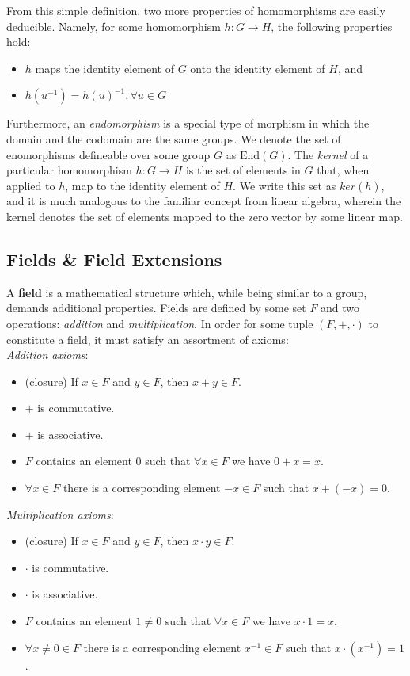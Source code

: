 From this simple definition, two more properties of homomorphisms are easily deducible. Namely, for some homomorphism $h: G \rightarrow H$, the following properties hold:
\begin{itemize}
\item $h$ maps the identity element of $G$ onto the identity element of $H$, and
\item $h(u^{-1}) = h(u)^{-1}, \forall u \in G$
\end{itemize}

Furthermore, an \emph{endomorphism} is a special type of morphism in which the domain and the codomain are the same groups. We denote the set of enomorphisms defineable over some group $G$ as $\text{End}(G)$.
The \emph{kernel} of a particular homomorphism $h: G \rightarrow H$  is the set of elements in $G$ that, when applied to $h$, map to the identity element of $H$. We write this set as $ker(h)$, and it is much analogous to the familiar concept from linear algebra, wherein the kernel denotes the set of elements mapped to the zero vector by some linear map.
\vspace{10mm}

\subsection{Fields \& Field Extensions}
\label{subsec:fields}

A \textbf{field} is a mathematical structure which, while being similar to a group, demands additional properties. Fields are defined by some set $F$ and two operations: \emph{addition} and \emph{multiplication}. In order for some tuple $(F,+,\cdot)$ to constitute a field, it must satisfy an assortment of axioms:\\

\emph{Addition axioms}:
\begin{itemize}
\item (closure) If $x \in F$ and $y \in F$, then $x + y \in F$.
\item $+$ is commutative.
\item $+$ is associative.
\item $F$ contains an element 0 such that $\forall x \in F$ we have $0 + x = x$.
\item $\forall x \in F$ there is a corresponding element $-x \in F$ such that $x + (-x) = 0$.
\end{itemize}

\emph{Multiplication axioms}:
\begin{itemize}
\item (closure) If $x \in F$ and $y \in F$, then $x \cdot y \in F$.
\item $\cdot$ is commutative.
\item $\cdot$ is associative.
\item $F$ contains an element $1 \neq 0$ such that $\forall x \in F$ we have $x \cdot 1 = x$.
\item $\forall x \neq 0 \in F$ there is a corresponding element $x^{-1} \in F$ such that $x \cdot (x^{-1}) = 1$.
\end{itemize}

